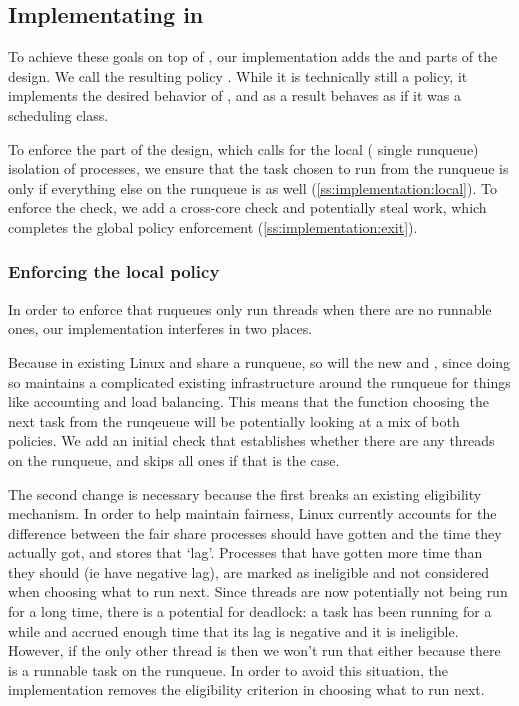 \subsection{Implementating \beclass{} in \schedbe{}}

To achieve these goals on top of \schedidle{}, our implementation adds the
\local{} and \exit{} parts of the \beclass{} design. We call the resulting
policy \schedbe{}. While it is technically still a policy, it implements the
desired behavior of \beclass{}, and as a result behaves as if it was a
scheduling class.

To enforce the \local{} part of the design, which calls for the local (\ie{}
single runqueue) isolation of \schedbe{} processes, we ensure that the task
chosen to run from the runqueue is only \schedbe{} if everything else on the
runqueue is as well (\autoref{ss:implementation:local}). To enforce the \exit{}
check, we add a cross-core check and potentially steal work, which completes the
global policy enforcement (\autoref{ss:implementation:exit}).

\subsubsection{Enforcing the local policy}\label{ss:implementation:local}

In order to enforce that ruqueues only run \schedbe{} threads when there are no
runnable \schednormal{} ones, our implementation interferes in two places. 

Because in existing Linux \schedidle{} and \schednormal{} share a runqueue, so
will the new \schedbe{} and \schednormal{}, since doing so maintains a
complicated existing infrastructure around the runqueue for things like
accounting and load balancing. This means that the function choosing the next
task from the runqeueue will be potentially looking at a mix of both policies.
We add an initial check that establishes whether there are any \schednormal{}
threads on the runqueue, and skips all \schedbe{} ones if that is the case. 

The second change is necessary because the first breaks an existing eligibility
mechanism. In order to help maintain fairness, Linux currently accounts for the
difference between the fair share processes should have gotten and the time they
actually got, and stores that `lag'. Processes that have gotten more time than
they should (ie have negative lag), are marked as ineligible and not considered
when choosing what to run next. Since \schedbe{} threads are now potentially not
being run for a long time, there is a potential for deadlock: a \schednormal{}
task has been running for a while and accrued enough time that its lag is
negative and it is ineligible. However, if the only other thread is \schedbe{}
then we won't run that either because there is a runnable \schednormal{} task on
the runqueue. In order to avoid this situation, the implementation removes the
eligibility criterion in choosing what to run next.


